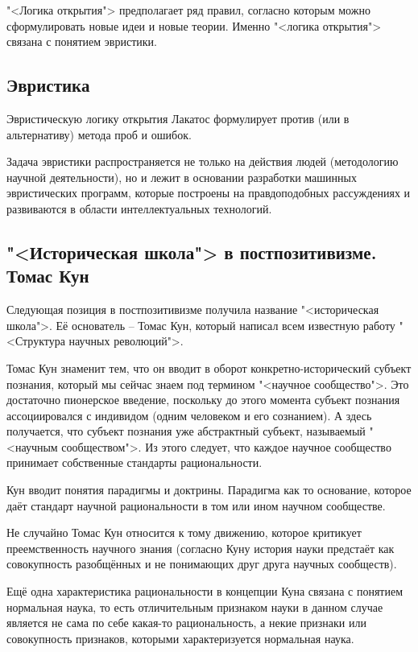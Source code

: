 \documentclass[main.tex]{subfiles}
\begin{document}
"<Логика открытия"> предполагает ряд правил, согласно которым можно сформулировать новые идеи и новые теории.
Именно "<логика открытия"> связана с понятием эвристики.

\subsection{Эвристика}


Эвристическую логику открытия Лакатос формулирует против (или в альтернативу) метода проб и ошибок.

Задача эвристики распространяется не только на действия людей (методологию научной деятельности), но и лежит в основании разработки машинных эвристических программ, которые построены на правдоподобных рассуждениях и развиваются в области интеллектуальных технологий.

\subsection{"<Историческая школа"> в постпозитивизме. Томас Кун}


Следующая позиция в постпозитивизме получила название "<историческая школа">.
Её основатель -- Томас Кун, который написал всем известную работу "<Структура научных революций">.

Томас Кун знаменит тем, что он вводит в оборот конкретно-исторический субъект познания, который мы сейчас знаем под термином "<научное сообщество">.
Это достаточно пионерское введение, поскольку до этого момента субъект познания ассоциировался с индивидом (одним человеком и его сознанием).
А здесь получается, что субъект познания уже абстрактный субъект, называемый "<научным сообществом">.
Из этого следует, что каждое научное сообщество принимает собственные стандарты рациональности.

Кун вводит понятия парадигмы и доктрины.
Парадигма как то основание, которое даёт стандарт научной рациональности в том или ином научном сообществе.

Не случайно Томас Кун относится к тому движению, которое критикует преемственность научного знания (согласно Куну история науки предстаёт как совокупность разобщённых и не понимающих друг друга научных сообществ).


Ещё одна характеристика рациональности в концепции Куна связана с понятием нормальная наука, то есть отличительным признаком науки в данном случае является не сама по себе какая-то рациональность, а некие признаки или совокупность признаков, которыми характеризуется нормальная наука.
\end{document}
